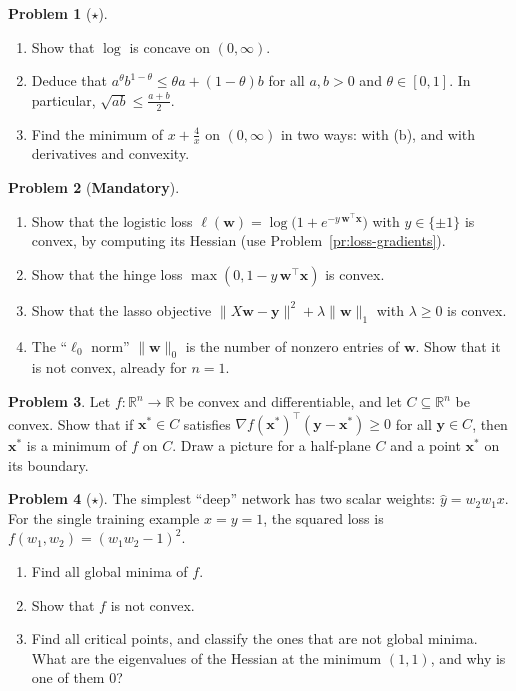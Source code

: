 \documentclass[11pt]{article}
\theoremstyle{definition}
\newtheorem{problem}{Problem}[section]
\newcommand{\mandatory}{\textcolor{red!70!black}{\textbf{Mandatory}}}
\newcommand{\norm}[1]{\lVert #1 \rVert}
\begin{document}
\begin{problem}[$\star$]\label{pr:am-gm}
    \begin{enumerate}[label=(\alph*)]
        \item Show that $\log$ is concave on $(0, \infty)$.
        \item Deduce that $a^\theta b^{1 - \theta} \leq \theta a + (1 - \theta)b$ for all $a, b > 0$ and $\theta \in [0, 1]$. In particular, $\sqrt{ab} \leq \frac{a + b}{2}$.
        \item Find the minimum of $x + \frac{4}{x}$ on $(0, \infty)$ in two ways: with (b), and with derivatives and convexity.
    \end{enumerate}
\end{problem}

\begin{problem}[\mandatory]\label{pr:convex-losses}
    \begin{enumerate}[label=(\alph*)]
        \item Show that the logistic loss $\ell(\mathbf{w}) = \log\big(1 + e^{-y\,\mathbf{w}^\top\mathbf{x}}\big)$ with $y \in \{\pm 1\}$ is convex, by computing its Hessian (use Problem~\ref{pr:loss-gradients}).
        \item Show that the hinge loss $\max(0, 1 - y\,\mathbf{w}^\top\mathbf{x})$ is convex.
        \item Show that the lasso objective $\norm{X\mathbf{w} - \mathbf{y}}^2 + \lambda\norm{\mathbf{w}}_1$ with $\lambda \geq 0$ is convex.
        \item The ``$\ell_0$ norm'' $\norm{\mathbf{w}}_0$ is the number of nonzero entries of $\mathbf{w}$. Show that it is not convex, already for $n = 1$.
    \end{enumerate}
\end{problem}

\begin{problem}\label{pr:first-order-optimality}
    Let $f: \mathbb{R}^n \to \mathbb{R}$ be convex and differentiable, and let $C \subseteq \mathbb{R}^n$ be convex. Show that if $\mathbf{x}^* \in C$ satisfies $\nabla f(\mathbf{x}^*)^\top(\mathbf{y} - \mathbf{x}^*) \geq 0$ for all $\mathbf{y} \in C$, then $\mathbf{x}^*$ is a minimum of $f$ on $C$. Draw a picture for a half-plane $C$ and a point $\mathbf{x}^*$ on its boundary.
\end{problem}

\begin{problem}[$\star$]\label{pr:two-layer-scalar}
    The simplest ``deep'' network has two scalar weights: $\hat y = w_2 w_1 x$. For the single training example $x = y = 1$, the squared loss is $f(w_1, w_2) = (w_1 w_2 - 1)^2$.
    \begin{enumerate}[label=(\alph*)]
        \item Find all global minima of $f$.
        \item Show that $f$ is not convex.
        \item Find all critical points, and classify the ones that are not global minima. What are the eigenvalues of the Hessian at the minimum $(1, 1)$, and why is one of them $0$?
    \end{enumerate}
\end{problem}
\end{document}
